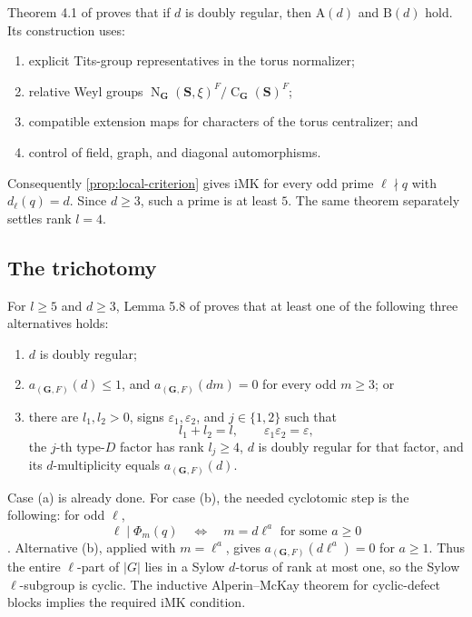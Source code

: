 \documentclass[11pt]{article}
\newcommand{\Norm}{\operatorname{N}}
\newcommand{\Cent}{\operatorname{C}}
\newcommand{\IMK}{\mathrm{iMK}}
\newcommand{\Ad}{\mathrm{A}(d)}
\newcommand{\Bd}{\mathrm{B}(d)}
\newcommand{\G}{\mathbf{G}}
\newcommand{\Sbf}{\mathbf{S}}
\begin{document}
Theorem 4.1 of \cite{CabanesSpath2026} proves that if \(d\) is doubly
regular, then \(\Ad\) and \(\Bd\) hold.  Its construction uses:

\begin{enumerate}
  \item explicit Tits-group representatives in the torus normalizer;
  \item relative Weyl groups
  \(\Norm_{\G}(\Sbf,\xi)^F/\Cent_{\G}(\Sbf)^F\);
  \item compatible extension maps for characters of the torus
  centralizer; and
  \item control of field, graph, and diagonal automorphisms.
\end{enumerate}

Consequently \cref{prop:local-criterion} gives \(\IMK\) for every odd
prime \(\ell\nmid q\) with \(d_\ell(q)=d\).  Since \(d\geq3\), such a
prime is at least \(5\).  The same theorem separately settles rank
\(l=4\).

\subsection{The trichotomy}

For \(l\geq5\) and \(d\geq3\), Lemma 5.8 of
\cite{CabanesSpath2026} proves that at least one of the following three
alternatives holds:

\begin{enumerate}[label=(\alph*)]
  \item \(d\) is doubly regular;
  \item \(a_{(\G,F)}(d)\leq1\), and
  \(a_{(\G,F)}(dm)=0\) for every odd \(m\geq3\); or
  \item there are \(l_1,l_2>0\), signs
  \(\varepsilon_1,\varepsilon_2\), and \(j\in\{1,2\}\) such that
  \[
    l_1+l_2=l,\qquad
    \varepsilon_1\varepsilon_2=\varepsilon,
  \]
  the \(j\)-th type-\(D\) factor has rank \(l_j\geq4\), \(d\) is
  doubly regular for that factor, and its \(d\)-multiplicity equals
  \(a_{(\G,F)}(d)\).
\end{enumerate}

Case (a) is already done.  For case (b), the needed cyclotomic step is
the following: for odd \(\ell\),
\[
  \ell\mid\Phi_m(q)
  \quad\Longleftrightarrow\quad
  m=d\ell^a\text{ for some }a\geq0
\]
\cite[Lemma 5.2(a)]{Malle2007}.  Alternative (b), applied with
\(m=\ell^a\), gives
\(a_{(\G,F)}(d\ell^a)=0\) for \(a\geq1\).  Thus the entire
\(\ell\)-part of \(|G|\) lies in a Sylow \(d\)-torus of rank at most one,
so the Sylow \(\ell\)-subgroup is cyclic.  The inductive Alperin--McKay
theorem for cyclic-defect blocks \cite{KoshitaniSpath2016} implies the
required \(\IMK\) condition.
\end{document}
